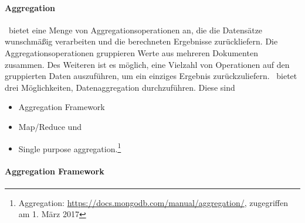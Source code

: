 %
%
%
%
%
%

\paragraph{Aggregation}\label{aggr}
\mongo\ bietet eine Menge von Aggregationsoperationen an, die die Datensätze wunschmäßig verarbeiten und die berechneten Ergebnisse zurückliefern. Die Aggregationsoperationen gruppieren Werte aus mehreren Dokumenten zusammen. Des Weiteren ist es möglich, eine Vielzahl von Operationen auf den gruppierten Daten auszuführen, um ein einziges Ergebnis zurückzuliefern. \mongo\ bietet drei Möglichkeiten, Datenaggregation durchzuführen. Diese sind 
\begin{itemize}
\item Aggregation Framework
\item Map/Reduce und
\item Single purpose aggregation.\footnote{Aggregation: \url{https://docs.mongodb.com/manual/aggregation/}, zugegriffen am 1. März 2017}
\end{itemize}

\paragraph{Aggregation Framework}\label{aggrFr}

